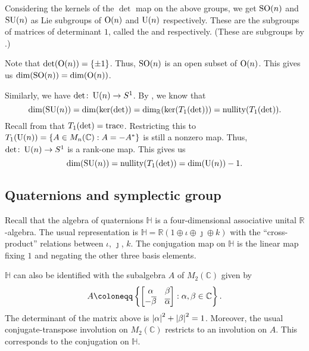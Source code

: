 \documentclass[12pt]{article}
\begin{document}
\begin{ex} \label{ex:special-orthogonal-unitary-groups-dimensions}
	Considering the kernels of the $\det$ map on the above groups, 
	we get $\operatorname{SO}(n)$ and $\operatorname{SU}(n)$ as Lie subgroups of $\operatorname{O}(n)$ 
	and $\operatorname{U}(n)$ respectively. 
	These are the subgroups of matrices of determinant $1$, called the  
	and  respectively. 
	(These are subgroups by .)

	Note that $\det(\operatorname{O}(n)) = \{\pm 1\}$. Thus, $\operatorname{SO}(n)$ is an open subset of $\operatorname{O}(n)$. 
	This gives us $\dim(\operatorname{SO}(n)) = \dim(\operatorname{O}(n))$.

	Similarly, we have $\det \colon \operatorname{U}(n) \to S^{1}$. 
	By , we know that
	\begin{equation*} 
		\dim(\operatorname{SU}(n)) = \dim(\ker(\det)) = \dim_{\mathbb{R}}(\ker(T_{1}(\det))) = \operatorname{nullity}(T_{1}(\det)).
	\end{equation*}
	Recall from  that $T_{1}(\det) = \operatorname{trace}$. 
	Restricting this to $T_{1}(\operatorname{U}(n)) = \{A \in M_{n}(\mathbb{C}) : A = -A^{\ast}\}$ is still a nonzero map. 
	Thus, $\det \colon \operatorname{U}(n) \to S^{1}$ is a rank-one map. This gives us
	\begin{equation*} 
		\dim(\operatorname{SU}(n)) = \operatorname{nullity}(T_{1}(\det)) = \dim(\operatorname{U}(n)) - 1.
	\end{equation*}
\end{ex}

\subsection{Quaternions and symplectic group} \label{subsec:sympletic-group}

Recall that the algebra of quaternions $\mathbb{H}$ is a four-dimensional associative unital $\mathbb{R}$-algebra. 
The usual representation is $\mathbb{H} = \mathbb{R}(1 \oplus \iota \oplus \jmath \oplus k)$ with the ``cross-product'' relations between $\iota$, $\jmath$, $k$. 
The conjugation map on $\mathbb{H}$ is the linear map fixing $1$ and negating the other three basis elements.

$\mathbb{H}$ can also be identified with the subalgebra $A$ of $M_{2}(\mathbb{C})$ given by
\begin{equation*} 
	A \coloneqq 
	\left\{\two{\alpha}{\beta}{-\overline{\beta}}{\overline{\alpha}} : \alpha, \beta \in \mathbb{C}\right\}.
\end{equation*}
The determinant of the matrix above is ${\left\lvert \alpha \right\lvert}^{2} + {\left\lvert \beta \right\lvert}^{2} = 1$. 
Moreover, the usual conjugate-transpose involution on $M_{2}(\mathbb{C})$ restricts to an involution on $A$. 
This corresponds to the conjugation on $\mathbb{H}$.
\end{document}
